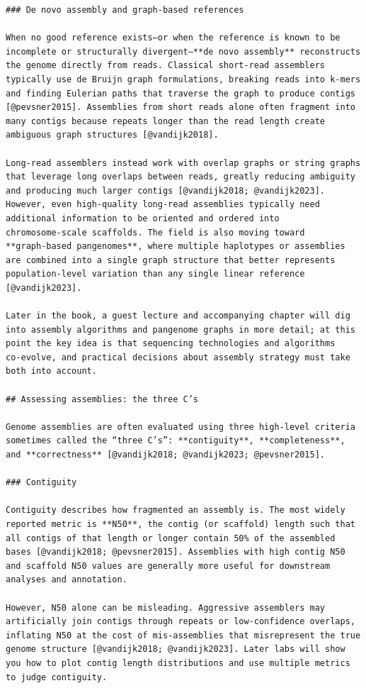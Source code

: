 \documentclass[
  letterpaper,
  DIV=11,
  numbers=noendperiod]{scrreprt}
\begin{document}
\begin{verbatim}
### De novo assembly and graph‑based references

When no good reference exists—or when the reference is known to be incomplete or structurally divergent—**de novo assembly** reconstructs the genome directly from reads. Classical short‑read assemblers typically use de Bruijn graph formulations, breaking reads into k‑mers and finding Eulerian paths that traverse the graph to produce contigs [@pevsner2015]. Assemblies from short reads alone often fragment into many contigs because repeats longer than the read length create ambiguous graph structures [@vandijk2018].

Long‑read assemblers instead work with overlap graphs or string graphs that leverage long overlaps between reads, greatly reducing ambiguity and producing much larger contigs [@vandijk2018; @vandijk2023]. However, even high‑quality long‑read assemblies typically need additional information to be oriented and ordered into chromosome‑scale scaffolds. The field is also moving toward **graph‑based pangenomes**, where multiple haplotypes or assemblies are combined into a single graph structure that better represents population‑level variation than any single linear reference [@vandijk2023].

Later in the book, a guest lecture and accompanying chapter will dig into assembly algorithms and pangenome graphs in more detail; at this point the key idea is that sequencing technologies and algorithms co‑evolve, and practical decisions about assembly strategy must take both into account.

## Assessing assemblies: the three C’s

Genome assemblies are often evaluated using three high‑level criteria sometimes called the “three C’s”: **contiguity**, **completeness**, and **correctness** [@vandijk2018; @vandijk2023; @pevsner2015].

### Contiguity

Contiguity describes how fragmented an assembly is. The most widely reported metric is **N50**, the contig (or scaffold) length such that all contigs of that length or longer contain 50% of the assembled bases [@vandijk2018; @pevsner2015]. Assemblies with high contig N50 and scaffold N50 values are generally more useful for downstream analyses and annotation.

However, N50 alone can be misleading. Aggressive assemblers may artificially join contigs through repeats or low‑confidence overlaps, inflating N50 at the cost of mis‑assemblies that misrepresent the true genome structure [@vandijk2018; @vandijk2023]. Later labs will show you how to plot contig length distributions and use multiple metrics to judge contiguity.


\end{verbatim}
\end{document}
